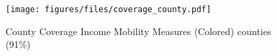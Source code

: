 

\begin{figure}[htp]
\caption{County Coverage Income Mobility Measures (Colored)  counties (91\%)}
\centering

    \texttt{[image: figures/files/coverage\_county.pdf]}


  \label{fig:county_coverage}
\end{figure}

